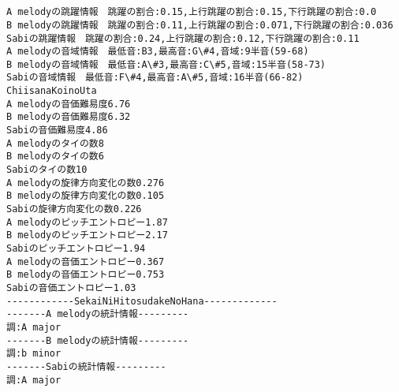 \documentclass[11pt]{article}
\begin{document}
    \begin{center}
    \end{center}
    { \hspace*{\fill} \\}
    
    \begin{center}
    \end{center}
    { \hspace*{\fill} \\}
    
    \begin{Verbatim}[commandchars=\\\{\}]
A melodyの跳躍情報　跳躍の割合:0.15,上行跳躍の割合:0.15,下行跳躍の割合:0.0
B melodyの跳躍情報　跳躍の割合:0.11,上行跳躍の割合:0.071,下行跳躍の割合:0.036
Sabiの跳躍情報　跳躍の割合:0.24,上行跳躍の割合:0.12,下行跳躍の割合:0.11
A melodyの音域情報　最低音:B3,最高音:G\#4,音域:9半音(59-68)
B melodyの音域情報　最低音:A\#3,最高音:C\#5,音域:15半音(58-73)
Sabiの音域情報　最低音:F\#4,最高音:A\#5,音域:16半音(66-82)
ChiisanaKoinoUta
A melodyの音価難易度6.76
B melodyの音価難易度6.32
Sabiの音価難易度4.86
A melodyのタイの数8
B melodyのタイの数6
Sabiのタイの数10
A melodyの旋律方向変化の数0.276
B melodyの旋律方向変化の数0.105
Sabiの旋律方向変化の数0.226
A melodyのピッチエントロピー1.87
B melodyのピッチエントロピー2.17
Sabiのピッチエントロピー1.94
A melodyの音価エントロピー0.367
B melodyの音価エントロピー0.753
Sabiの音価エントロピー1.03
------------SekaiNiHitosudakeNoHana-------------
-------A melodyの統計情報---------
調:A major
-------B melodyの統計情報---------
調:b minor
-------Sabiの統計情報---------
調:A major

    \end{Verbatim}

    \begin{center}
    \end{center}
    { \hspace*{\fill} \\}
    
    \begin{center}
    \end{center}
    { \hspace*{\fill} \\}
    
\end{document}
